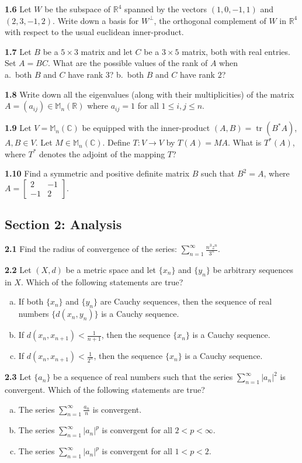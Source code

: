 \documentclass[11pt,a4paper]{article}
\newcommand{\R}{\mathbb{R}}
\newcommand{\C}{\mathbb{C}}
\newcommand{\M}{\mathbb{M}}
\newcommand{\tr}{\operatorname{tr}}
\newcommand{\examsec}[1]{%
  \subsection*{#1}
  \vspace{-2pt}
}
\newcommand{\qitem}[1]{\par\medskip\noindent\textbf{#1}\hspace{0.5em}}
\begin{document}
\qitem{1.6} Let $W$ be the subspace of $\R^4$ spanned by the vectors $(1, 0, -1, 1)$ and $(2, 3, -1, 2)$. Write down a basis for $W^\perp$, the orthogonal complement of $W$ in $\R^4$ with respect to the usual euclidean inner-product.

\qitem{1.7} Let $B$ be a $5 \times 3$ matrix and let $C$ be a $3 \times 5$ matrix, both with real entries. Set $A = BC$. What are the possible values of the rank of $A$ when\\
a.\ both $B$ and $C$ have rank $3$? \qquad b.\ both $B$ and $C$ have rank $2$?

\qitem{1.8} Write down all the eigenvalues (along with their multiplicities) of the matrix $A = (a_{ij}) \in \M_n(\R)$ where $a_{ij} = 1$ for all $1 \le i, j \le n$.

\qitem{1.9} Let $V = \M_n(\C)$ be equipped with the inner-product $(A, B) = \tr(B^* A)$, $A, B \in V$. Let $M \in \M_n(\C)$. Define $T : V \to V$ by $T(A) = MA$. What is $T^*(A)$, where $T^*$ denotes the adjoint of the mapping $T$?

\qitem{1.10} Find a symmetric and positive definite matrix $B$ such that $B^2 = A$, where $A = \begin{bmatrix} 2 & -1 \\ -1 & 2 \end{bmatrix}$.

\examsec{Section 2: Analysis}

\qitem{2.1} Find the radius of convergence of the series: $\displaystyle\sum_{n=1}^{\infty} \frac{n^3 z^n}{3^n}$.

\qitem{2.2} Let $(X, d)$ be a metric space and let $\{x_n\}$ and $\{y_n\}$ be arbitrary sequences in $X$. Which of the following statements are true?
\begin{enumerate}[a.]
  \item If both $\{x_n\}$ and $\{y_n\}$ are Cauchy sequences, then the sequence of real numbers $\{d(x_n, y_n)\}$ is a Cauchy sequence.
  \item If $d(x_n, x_{n+1}) < \frac{1}{n+1}$, then the sequence $\{x_n\}$ is a Cauchy sequence.
  \item If $d(x_n, x_{n+1}) < \frac{1}{2^n}$, then the sequence $\{x_n\}$ is a Cauchy sequence.
\end{enumerate}

\qitem{2.3} Let $\{a_n\}$ be a sequence of real numbers such that the series $\sum_{n=1}^{\infty} |a_n|^2$ is convergent. Which of the following statements are true?
\begin{enumerate}[a.]
  \item The series $\sum_{n=1}^{\infty} \frac{a_n}{n}$ is convergent.
  \item The series $\sum_{n=1}^{\infty} |a_n|^p$ is convergent for all $2 < p < \infty$.
  \item The series $\sum_{n=1}^{\infty} |a_n|^p$ is convergent for all $1 < p < 2$.
\end{enumerate}
\end{document}
